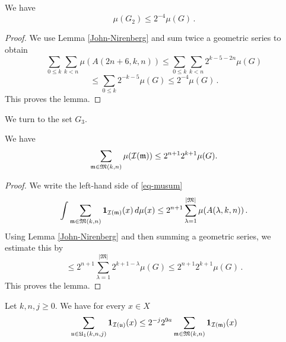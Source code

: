 {\begin{lemma}
\label{second-exception}
We have
\begin{equation}
    \mu(G_2)\le 2^{-4} \mu(G)\, .
\end{equation}
\end{lemma}
\begin{proof}

We use Lemma \ref{John-Nirenberg} and sum twice a geometric series
to obtain
\begin{equation}
    \sum_{0\le  k}\sum_{k< n}
\mu(A(2n+6,k,n))\le \sum_{0\le  k}\sum_{k< n} 2^{k-5-2n}\mu(G)
\end{equation}
\begin{equation}
   \le \sum_{0\le  k} 2^{-k-5}\mu(G)\le 2^{-4}\mu(G)\, .
\end{equation}
This proves the lemma.
\end{proof}


We turn to the set $G_3$.

\begin{lemma}
\label{top-tiles}
    We have
    \begin{equation}\label{eq-musum}
        \sum_{\mathfrak{m} \in \mathfrak{M}(k,n)} \mu(\sc(\mathfrak{m}))\le 2^{n+1}2^{k+1}\mu(G).
    \end{equation}
\end{lemma}
\begin{proof}
    We write the left-hand side of \eqref{eq-musum}
\begin{equation}
    \int \sum_{\mathfrak{m} \in \mathfrak{M}(k,n)} \mathbf{1}_{\sc(\mathfrak{m})}(x) \, d\mu(x) \le
2^{n+1} \sum_{\lambda=1}^{|\mathfrak{M}|}\mu(A(\lambda, k,n))\,.
\end{equation}
Using Lemma \ref{John-Nirenberg}
and then summing a geometric series, we estimate this by
\begin{equation}
    \le
2^{n+1}\sum_{\lambda=1}^{|\mathfrak{M}|}
2^{k+1-\lambda}\mu(G)
\le
2^{n+1}2^{k+1}\mu(G)\, .
\end{equation}
This proves the lemma.
\end{proof}


\begin{lemma}
\label{tree-count}

Let $k,n,j\ge 0$. We have for every $x\in X$
\begin{equation}
    \sum_{\fu\in \fU_1(k,n,j)} \mathbf{1}_{\sc(\fu)}(x)
    \le 2^{-j}
    2^{9a} \sum_{\mathfrak{m}\in \mathfrak{M}(k,n)}
     \mathbf{1}_{\sc(\mathfrak{m})}(x)
\end{equation}
\end{lemma}

}
